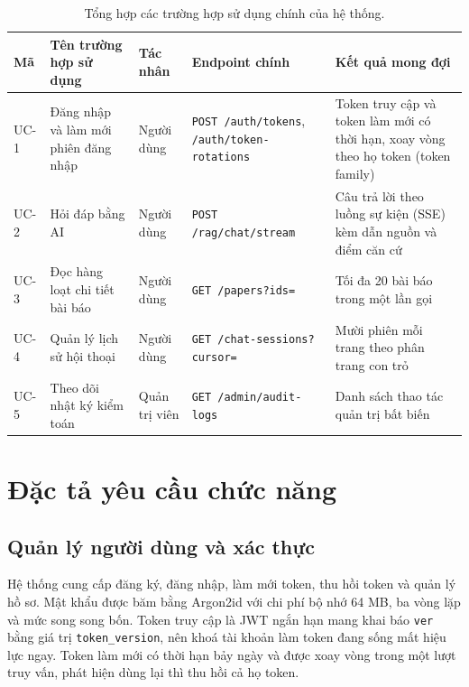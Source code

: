 \begin{table}[htbp]
    \centering
    \caption{Tổng hợp các trường hợp sử dụng chính của hệ thống.}
    \label{tab:use-case}
    \small
    \begin{tabularx}{\textwidth}{@{}l>{\raggedright\arraybackslash}p{3.0cm}>{\raggedright\arraybackslash}p{1.9cm}>{\raggedright\arraybackslash}p{4.5cm}>{\raggedright\arraybackslash}X@{}}
        \toprule
        \textbf{Mã} & \textbf{Tên trường hợp sử dụng} & \textbf{Tác nhân} & \textbf{Endpoint chính} & \textbf{Kết quả mong đợi} \\
        \midrule
        UC-1 & Đăng nhập và làm mới phiên đăng nhập & Người dùng & \texttt{POST /auth/tokens}, \texttt{/auth/token-rotations} & Token truy cập và token làm mới có thời hạn, xoay vòng theo họ token (token family) \\
        UC-2 & Hỏi đáp bằng AI & Người dùng & \texttt{POST /rag/chat/stream} & Câu trả lời theo luồng sự kiện (SSE) kèm dẫn nguồn và điểm căn cứ \\
        UC-3 & Đọc hàng loạt chi tiết bài báo & Người dùng & \texttt{GET /papers?ids=} & Tối đa 20 bài báo trong một lần gọi \\
        UC-4 & Quản lý lịch sử hội thoại & Người dùng & \texttt{GET /chat-sessions?cursor=} & Mười phiên mỗi trang theo phân trang con trỏ \\
        UC-5 & Theo dõi nhật ký kiểm toán & Quản trị viên & \texttt{GET /admin/audit-logs} & Danh sách thao tác quản trị bất biến \\
        \bottomrule
    \end{tabularx}
\end{table}

\section{Đặc tả yêu cầu chức năng}
\label{sec:dac-ta-chuc-nang}

\subsection{Quản lý người dùng và xác thực}
\label{subsec:quan-ly-nguoi-dung}

Hệ thống cung cấp đăng ký, đăng nhập, làm mới token, thu hồi token và quản lý hồ sơ. Mật khẩu được băm bằng Argon2id với chi phí bộ nhớ 64 MB, ba vòng lặp và mức song song bốn. Token truy cập là JWT ngắn hạn mang khai báo \texttt{ver} bằng giá trị \texttt{token\_version}, nên khoá tài khoản làm token đang sống mất hiệu lực ngay. Token làm mới có thời hạn bảy ngày và được xoay vòng trong một lượt truy vấn, phát hiện dùng lại thì thu hồi cả họ token.

